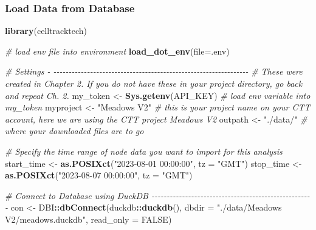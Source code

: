 \documentclass[
]{book}
\newenvironment{Shaded}{\begin{snugshade}}{\end{snugshade}}
\newcommand{\AttributeTok}[1]{\textcolor[rgb]{0.13,0.29,0.53}{#1}}
\newcommand{\CommentTok}[1]{\textcolor[rgb]{0.56,0.35,0.01}{\textit{#1}}}
\newcommand{\ConstantTok}[1]{\textcolor[rgb]{0.56,0.35,0.01}{#1}}
\newcommand{\FunctionTok}[1]{\textcolor[rgb]{0.13,0.29,0.53}{\textbf{#1}}}
\newcommand{\NormalTok}[1]{#1}
\newcommand{\OtherTok}[1]{\textcolor[rgb]{0.56,0.35,0.01}{#1}}
\newcommand{\SpecialCharTok}[1]{\textcolor[rgb]{0.81,0.36,0.00}{\textbf{#1}}}
\newcommand{\StringTok}[1]{\textcolor[rgb]{0.31,0.60,0.02}{#1}}
\begin{document}
\subsubsection{Load Data from Database}\label{load-data-from-database}

\begin{Shaded}
\begin{Highlighting}[]
\FunctionTok{library}\NormalTok{(celltracktech)}

\CommentTok{\# load env file into environment}
\FunctionTok{load\_dot\_env}\NormalTok{(}\AttributeTok{file=}\StringTok{\textquotesingle{}.env\textquotesingle{}}\NormalTok{)}

\CommentTok{\# Settings {-} {-}{-}{-}{-}{-}{-}{-}{-}{-}{-}{-}{-}{-}{-}{-}{-}{-}{-}{-}{-}{-}{-}{-}{-}{-}{-}{-}{-}{-}{-}{-}{-}{-}{-}{-}{-}{-}{-}{-}{-}{-}{-}{-}{-}{-}{-}{-}{-}{-}{-}{-}{-}{-}{-}{-}{-}{-}{-}{-}{-}{-}{-}{-}{-}}
\CommentTok{\# These were created in Chapter 2. If you do not have these in your project directory, go back and repeat Ch. 2.}
\NormalTok{my\_token }\OtherTok{\textless{}{-}} \FunctionTok{Sys.getenv}\NormalTok{(}\StringTok{\textquotesingle{}API\_KEY\textquotesingle{}}\NormalTok{) }\CommentTok{\# load env variable into my\_token}
\NormalTok{myproject }\OtherTok{\textless{}{-}} \StringTok{"Meadows V2"} \CommentTok{\# this is your project name on your CTT account, here we are using the CTT project \textquotesingle{}Meadows V2\textquotesingle{}}
\NormalTok{outpath }\OtherTok{\textless{}{-}} \StringTok{"./data/"} \CommentTok{\# where your downloaded files are to go}

\CommentTok{\# Specify the time range of node data you want to import for this analysis}
\NormalTok{start\_time }\OtherTok{\textless{}{-}} \FunctionTok{as.POSIXct}\NormalTok{(}\StringTok{"2023{-}08{-}01 00:00:00"}\NormalTok{, }\AttributeTok{tz =} \StringTok{"GMT"}\NormalTok{)}
\NormalTok{stop\_time }\OtherTok{\textless{}{-}} \FunctionTok{as.POSIXct}\NormalTok{(}\StringTok{"2023{-}08{-}07 00:00:00"}\NormalTok{, }\AttributeTok{tz =} \StringTok{"GMT"}\NormalTok{)}

\CommentTok{\# Connect to Database using DuckDB {-}{-}{-}{-}{-}{-}{-}{-}{-}{-}{-}{-}{-}{-}{-}{-}{-}{-}{-}{-}{-}{-}{-}{-}{-}{-}{-}{-}{-}{-}{-}{-}{-}{-}{-}{-}{-}{-}{-}{-}{-}{-}{-}{-}{-}{-}{-}{-}{-}{-}{-}{-}{-}}
\NormalTok{con }\OtherTok{\textless{}{-}}\NormalTok{ DBI}\SpecialCharTok{::}\FunctionTok{dbConnect}\NormalTok{(duckdb}\SpecialCharTok{::}\FunctionTok{duckdb}\NormalTok{(), }
                      \AttributeTok{dbdir =} \StringTok{"./data/Meadows V2/meadows.duckdb"}\NormalTok{, }
                      \AttributeTok{read\_only =} \ConstantTok{FALSE}\NormalTok{)}


\end{Highlighting}
\end{Shaded}
\end{document}

